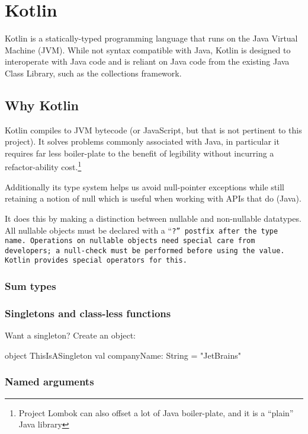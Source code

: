 
\section{Kotlin}

Kotlin is a statically-typed programming language that runs on the
Java Virtual Machine (JVM). While not syntax compatible with Java,
Kotlin is designed to interoperate with Java code and is reliant on
Java code from the existing Java Class Library, such as the
collections framework.

\subsection{Why Kotlin}

Kotlin compiles to JVM bytecode (or JavaScript, but that is not
pertinent to this project). It solves problems commonly associated
with Java, in particular it requires far less boiler-plate to the
benefit of legibility without incurring a refactor-ability
cost.\footnote{Project Lombok can also offset a lot of Java
  boiler-plate, and it is a ``plain'' Java library}

Additionally its type system helps us avoid null-pointer exceptions
while still retaining a notion of null which is useful when working
with APIs that do (Java).

It does this by making a distinction between nullable and non-nullable
datatypes. All nullable objects must be declared with a ``\tt{?}''
postfix after the type name. Operations on nullable objects need
special care from developers; a null-check must be performed before
using the value. Kotlin provides special operators for this.

\subsubsection{Sum types}


\subsubsection{Singletons and class-less functions}

Want a singleton? Create an object:

object ThisIsASingleton {
    val companyName: String = "JetBrains"
  }

  \subsubsection{Named arguments}



